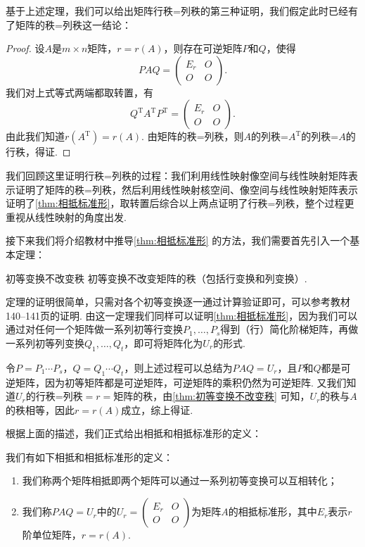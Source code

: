基于上述定理，我们可以给出矩阵行秩=列秩的第三种证明，我们假定此时已经有了矩阵的秩=列秩这一结论：

\begin{proof} \label{pf:11:矩阵行秩=列秩}
    设$A$是$m\times n$矩阵，$r=r(A)$，则存在可逆矩阵$P$和$Q$，使得
    \[PAQ=\begin{pmatrix}
            E_r & O \\ O & O
        \end{pmatrix}.\]
    我们对上式等式两端都取转置，有
    \[Q^\mathrm{T}A^\mathrm{T}P^\mathrm{T}=\begin{pmatrix}
            E_r & O \\ O & O
        \end{pmatrix}.\]
    由此我们知道$r(A^\mathrm{T})=r(A)$. 由矩阵的秩=列秩，则$A$的列秩=$A^\mathrm{T}$的列秩=$A$的行秩，得证.
\end{proof}

我们回顾这里证明行秩=列秩的过程：我们利用线性映射像空间与线性映射矩阵表示证明了矩阵的秩=列秩，然后利用线性映射核空间、像空间与线性映射矩阵表示证明了\autoref{thm:相抵标准形}，取转置后综合以上两点证明了行秩=列秩，整个过程更重视从线性映射的角度出发.

接下来我们将介绍教材中推导\autoref*{thm:相抵标准形} 的方法，我们需要首先引入一个基本定理：
\begin{theorem}{}{初等变换不改变秩}
    初等变换不改变矩阵的秩（包括行变换和列变换）.
\end{theorem}
定理的证明很简单，只需对各个初等变换逐一通过计算验证即可，可以参考教材140--141页的证明. 由这一定理我们同样可以证明\autoref*{thm:相抵标准形}，因为我们可以通过对任何一个矩阵做一系列初等行变换$P_1,\ldots,P_s$得到（行）简化阶梯矩阵，再做一系列初等列变换$Q_1,\ldots,Q_t$，即可将矩阵化为$U_r$的形式.

令$P=P_1\cdots P_s$，$Q=Q_1\cdots Q_t$，则上述过程可以总结为$PAQ=U_r$，且$P$和$Q$都是可逆矩阵，因为初等矩阵都是可逆矩阵，可逆矩阵的乘积仍然为可逆矩阵. 又我们知道$U_r$的行秩=列秩$=r=$矩阵的秩，由\autoref{thm:初等变换不改变秩} 可知，$U_r$的秩与$A$的秩相等，因此$r=r(A)$成立，综上得证.

根据上面的描述，我们正式给出相抵和相抵标准形的定义：
\begin{definition}{}{}
    我们有如下相抵和相抵标准形的定义：
    \begin{enumerate}
        \item 我们称两个矩阵相抵即两个矩阵可以通过一系列初等变换可以互相转化；

        \item 我们称$PAQ=U_r$中的$U_r=\begin{pmatrix}
                      E_r & O \\ O & O
                  \end{pmatrix}$为矩阵$A$的相抵标准形，其中$E_r$表示$r$阶单位矩阵，$r=r(A)$.
    \end{enumerate}
\end{definition}

